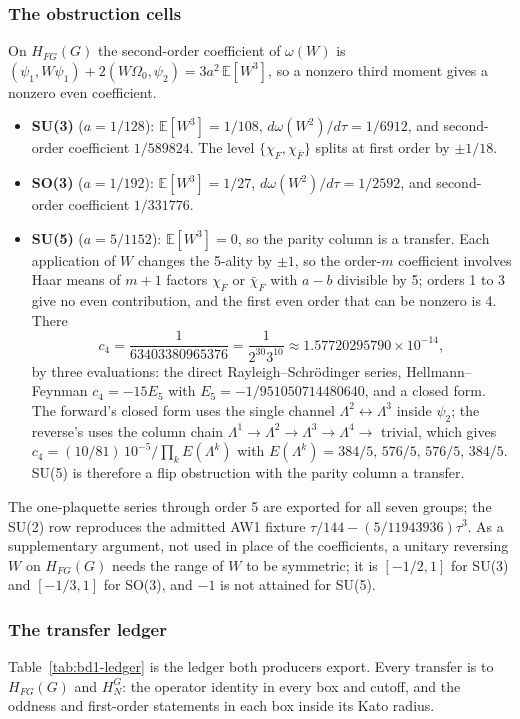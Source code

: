 \subsubsection{The obstruction cells}
\label{sec:bd1-obstructions}
On $H_{FG}(G)$ the second-order coefficient of $\omega(W)$ is
$(\psi_1,W\psi_1)+2(W\Omega_0,\psi_2)=3a^2\,\mathbb E[W^3]$, so a nonzero third
moment gives a nonzero even coefficient.
\begin{itemize}
\item \textbf{SU(3)} ($a=1/128$): $\mathbb E[W^3]=1/108$,
 $d\omega(W^2)/d\tau=1/6912$, and second-order coefficient $1/589824$. The
 level $\{\chi_F,\chi_{\bar F}\}$ splits at first order by $\pm1/18$.
\item \textbf{SO(3)} ($a=1/192$): $\mathbb E[W^3]=1/27$,
 $d\omega(W^2)/d\tau=1/2592$, and second-order coefficient $1/331776$.
\item \textbf{SU(5)} ($a=5/1152$): $\mathbb E[W^3]=0$, so the parity column is a
 transfer. Each application of $W$ changes the 5-ality by $\pm1$, so the
 order-$m$ coefficient involves Haar means of $m+1$ factors $\chi_F$ or
 $\bar\chi_F$ with $a-b$ divisible by 5; orders 1 to 3 give no even
 contribution, and the first even order that can be nonzero is 4. There
 \begin{equation}
 c_4=\frac1{63403380965376}=\frac1{2^{30}3^{10}}\approx1.57720295790\times10^{-14},
 \label{eq:bd1-su5}
 \end{equation}
 by three evaluations: the direct Rayleigh--Schr\"odinger series,
 Hellmann--Feynman $c_4=-15E_5$ with $E_5=-1/951050714480640$, and a closed
 form. The forward's closed form uses the single channel
 $\Lambda^2\leftrightarrow\Lambda^3$ inside $\psi_2$; the reverse's uses the
 column chain $\Lambda^1\to\Lambda^2\to\Lambda^3\to\Lambda^4\to$ trivial, which
 gives $c_4=(10/81)\,10^{-5}/\prod_kE(\Lambda^k)$ with
 $E(\Lambda^k)=384/5,\,576/5,\,576/5,\,384/5$. SU(5) is therefore a flip
 obstruction with the parity column a transfer.
\end{itemize}
The one-plaquette series through order 5 are exported for all seven groups;
the SU(2) row reproduces the admitted AW1 fixture
$\tau/144-(5/11943936)\tau^3$. As a supplementary argument, not used in place
of the coefficients, a unitary reversing $W$ on $H_{FG}(G)$ needs the range of
$W$ to be symmetric; it is $[-1/2,1]$ for SU(3) and $[-1/3,1]$ for SO(3), and
$-1$ is not attained for SU(5).

\subsubsection{The transfer ledger}
\label{sec:bd1-ledger}
Table~\ref{tab:bd1-ledger} is the ledger both producers export. Every
transfer is to $H_{FG}(G)$ and $H^G_N$: the operator identity in every box and
cutoff, and the oddness and first-order statements in each box inside its
Kato radius.

